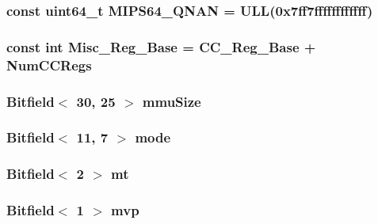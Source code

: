 \label{namespaceMipsISA_ade780efa968a53a892f8bd18ca98f768}
\hypertarget{namespaceMipsISA_adb5f9fda6003fbf909506191e9814579}{
\subsubsection[{MIPS64\_\-QNAN}]{\setlength{\rightskip}{0pt plus 5cm}const uint64\_\-t {\bf MIPS64\_\-QNAN} = ULL(0x7ff7ffffffffffff)}}
\label{namespaceMipsISA_adb5f9fda6003fbf909506191e9814579}
\hypertarget{namespaceMipsISA_a0ff03b99f2760c682de4e9cb0a3cd8a1}{
\subsubsection[{Misc\_\-Reg\_\-Base}]{\setlength{\rightskip}{0pt plus 5cm}const int {\bf Misc\_\-Reg\_\-Base} = {\bf CC\_\-Reg\_\-Base} + {\bf NumCCRegs}}}
\label{namespaceMipsISA_a0ff03b99f2760c682de4e9cb0a3cd8a1}
\hypertarget{namespaceMipsISA_a7855a07a9d8b9fd2b3754fa7ea272e69}{
\subsubsection[{mmuSize}]{\setlength{\rightskip}{0pt plus 5cm}Bitfield$<$ 30, 25 $>$ {\bf mmuSize}}}
\label{namespaceMipsISA_a7855a07a9d8b9fd2b3754fa7ea272e69}
\hypertarget{namespaceMipsISA_ae317cde5969f1a58116b73ae0d8adec0}{
\subsubsection[{mode}]{\setlength{\rightskip}{0pt plus 5cm}Bitfield$<$ 11, 7 $>$ {\bf mode}}}
\label{namespaceMipsISA_ae317cde5969f1a58116b73ae0d8adec0}
\hypertarget{namespaceMipsISA_a01dc58d27e12df489489c7355ce45ae9}{
\subsubsection[{mt}]{\setlength{\rightskip}{0pt plus 5cm}Bitfield$<$ 2 $>$ {\bf mt}}}
\label{namespaceMipsISA_a01dc58d27e12df489489c7355ce45ae9}
\hypertarget{namespaceMipsISA_aa9e0fc4e00b6e017d9ebf3034a3c058b}{
\subsubsection[{mvp}]{\setlength{\rightskip}{0pt plus 5cm}Bitfield$<$ 1 $>$ {\bf mvp}}}
